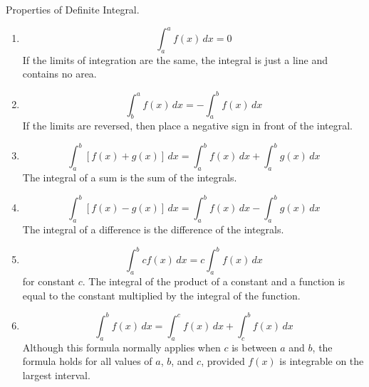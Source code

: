 \documentclass[12pt]{amsart}
\begin{document}
\begin{proposition}
	Properties of Definite Integral.
	\begin{enumerate}
		\item
		      \[
			      \int_a^a f(x) \, dx = 0
		      \]
		      If the limits of integration are the same, the integral is just a line and contains no area.

		\item
		      \[
			      \int_b^a f(x) \, dx = -\int_a^b f(x) \, dx
		      \]
		      If the limits are reversed, then place a negative sign in front of the integral.

		\item
		      \[
			      \int_a^b \left[f(x) + g(x)\right] \, dx = \int_a^b f(x) \, dx + \int_a^b g(x) \, dx
		      \]
		      The integral of a sum is the sum of the integrals.

		\item
		      \[
			      \int_a^b \left[f(x) - g(x)\right] \, dx = \int_a^b f(x) \, dx - \int_a^b g(x) \, dx
		      \]
		      The integral of a difference is the difference of the integrals.

		\item
		      \[
			      \int_a^b c f(x) \, dx = c \int_a^b f(x) \, dx
		      \]
		      for constant \( c \). The integral of the product of a constant and a function is equal to the constant multiplied by the integral of the function.

		\item
		      \[
			      \int_a^b f(x) \, dx = \int_a^c f(x) \, dx + \int_c^b f(x) \, dx
		      \]
		      Although this formula normally applies when \( c \) is between \( a \) and \( b \), the formula holds for all values of \( a \), \( b \), and \( c \), provided \( f(x) \) is integrable on the largest interval.
	\end{enumerate}
\end{proposition}
\end{document}
